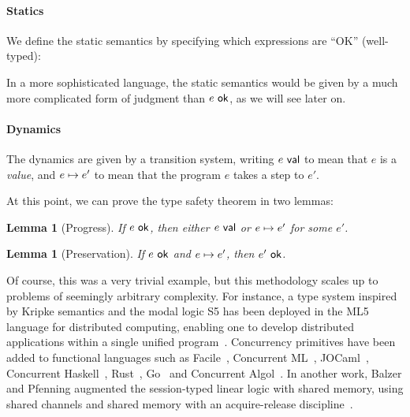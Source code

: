 \documentclass{article}
\newtheorem{lemma}[theorem]{Lemma}
\begin{document}
\paragraph{Statics} We define the static semantics by specifying which
expressions are ``OK'' (well-typed):

In a more sophisticated language, the static semantics would be given
by a much more complicated form of judgment than ${e}\ \mathsf{ok}$, as we
will see later on.

\paragraph{Dynamics}
The dynamics are given by a transition system, writing ${e}\ \mathsf{val}$ to
mean that $e$ is a \emph{value}, and ${e}\mapsto{e'}$ to mean that the
program $e$ takes a step to $e'$.

At this point, we can prove the type safety theorem in two lemmas:
\begin{lemma}[Progress]
  If ${e}\ \mathsf{ok}$, then either ${e}\ \mathsf{val}$ or ${e}\mapsto{e'}$ for some
  $e'$.
\end{lemma}
\begin{lemma}[Preservation]
  If ${e}\ \mathsf{ok}$ and ${e}\mapsto{e'}$, then ${e'}\ \mathsf{ok}$.
\end{lemma}

Of course, this was a very trivial example, but this methodology
scales up to problems of seemingly arbitrary complexity. For instance,
a type system inspired by Kripke semantics and the modal logic S5 has
been deployed in the ML5 language for distributed computing, enabling
one to develop distributed applications within a single unified
program~\cite{murphy-crary-harper:2008}. Concurrency primitives have
been added to functional languages such as
Facile~\cite{giacolone:1989}, Concurrent
ML~\cite{reppy:1991,reppy:2007}, JOCaml~\cite{conchon-fessant:1999},
Concurrent Haskell~\cite{jones-gordon-finne:1996},
Rust~\cite{turon:2012}, Go~\cite{donovan:2015} and Concurrent
Algol~\cite{harper:2016}. In another work, Balzer and Pfenning
augmented the session-typed linear logic with shared memory, using
shared channels and shared memory with an acquire-release
discipline~\cite{balzer-pfenning:2017}.
\end{document}
